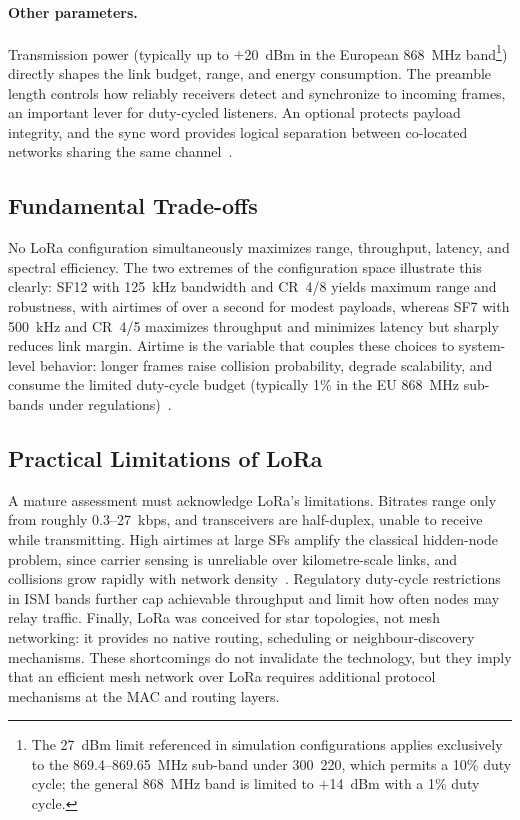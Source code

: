 \documentclass[english,bachelor]{tfgitic}[2026/01/22]
\begin{document}
\paragraph{Other parameters.} Transmission power (typically up to $+$20~dBm in the European 868~MHz  band\footnote{The 27~dBm limit referenced in simulation configurations applies exclusively to the 869.4--869.65~MHz sub-band under   300~220, which permits a 10\% duty cycle; the general 868~MHz  band is limited to $+$14~dBm with a 1\% duty cycle.}) directly shapes the link budget, range, and energy consumption.
The preamble length controls how reliably receivers detect and synchronize to incoming frames, an important lever for duty-cycled listeners.
An optional  protects payload integrity, and the sync word provides logical separation between co-located networks sharing the same channel~\cite{semtech2015an1200}.

\subsection{Fundamental Trade-offs}

No LoRa configuration simultaneously maximizes range, throughput, latency, and spectral efficiency. The two extremes of the configuration space illustrate this
clearly: SF12 with 125~kHz bandwidth and CR~4/8 yields maximum range and robustness, with airtimes of over a second for modest payloads, whereas SF7
with 500~kHz and CR~4/5 maximizes throughput and minimizes latency but sharply reduces link margin. Airtime is the variable that couples these choices to
system-level behavior: longer frames raise collision probability, degrade scalability, and consume the limited
duty-cycle budget (typically 1\% in the EU 868~MHz sub-bands under  regulations)~\cite{adelantado2017limits,bor2016scale}.

\subsection{Practical Limitations of LoRa}

A mature assessment must acknowledge LoRa's limitations. Bitrates range only from roughly 0.3--27~kbps, and transceivers are half-duplex,
unable to receive while transmitting. High airtimes at large SFs amplify the classical hidden-node problem, since carrier sensing is unreliable over 
kilometre-scale links, and collisions grow rapidly with network density~\cite{bor2016scale,adelantado2017limits}. 
Regulatory duty-cycle restrictions in ISM bands further cap achievable throughput and limit how often nodes may relay traffic. 
Finally, LoRa was conceived for star topologies, not mesh networking: it provides no native routing, scheduling or neighbour-discovery mechanisms. 
These shortcomings do not invalidate the technology, but they imply that an efficient mesh network over LoRa requires additional protocol 
mechanisms at the MAC and routing layers.
\end{document}
